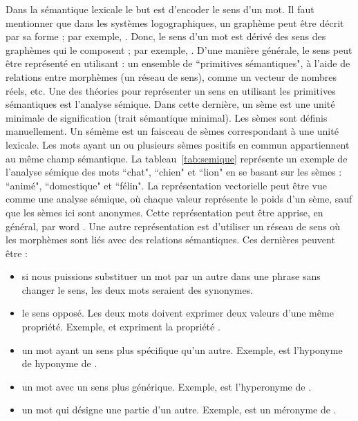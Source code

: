 \documentclass{KodeBook}
\begin{document}
Dans la sémantique lexicale le but est d'encoder le sens d'un mot. 
Il faut mentionner que dans les systèmes logographiques, un graphème peut être décrit par sa forme ; par exemple, .
Donc, le sens d'un mot est dérivé des sens des graphèmes qui le composent ; par exemple, .
D'une manière générale, le sens peut être représenté en utilisant : un ensemble de ``primitives sémantiques", à l'aide de relations entre morphèmes (un réseau de sens), comme un vecteur de nombres réels, etc.
Une des théories pour représenter un sens en utilisant les primitives sémantiques est l'analyse sémique. 
Dans cette dernière, un sème est une unité minimale de signification (trait sémantique minimal). 
Les sèmes sont définis manuellement. 
Un sémème est un faisceau de sèmes correspondant à une unité lexicale. 
Les mots ayant un ou plusieurs sèmes positifs en commun appartiennent au même champ sémantique.  
La tableau~\ref{tab:semique} représente un exemple de l'analyse sémique des mots ``chat", ``chien" et ``lion" en se basant sur les sèmes : ``animé", ``domestique" et ``félin". 
La représentation vectorielle peut être vue comme une analyse sémique, où chaque valeur représente le poids d'un sème, sauf que les sèmes ici sont anonymes. 
Cette représentation peut être apprise, en général, par word . 
Une autre représentation est d'utiliser un réseau de sens où les morphèmes sont liés avec des relations sémantiques.
Ces dernières peuvent être : 
\begin{itemize}
	\item {} si nous puissions substituer un mot par un autre dans une phrase sans changer le sens, les deux mots seraient des synonymes.
	\item {} le sens opposé. Les deux mots doivent exprimer deux valeurs d'une même propriété. Exemple,  et  expriment la propriété .
	\item {} un mot ayant un sens plus spécifique qu'un autre. Exemple,  est l'hyponyme de  hyponyme de . 
	\item {} un mot avec un sens plus générique. Exemple,  est l'hyperonyme de .
	\item {} un mot qui désigne une partie d'un autre. Exemple,  est un méronyme de .
\end{itemize}
\end{document}

